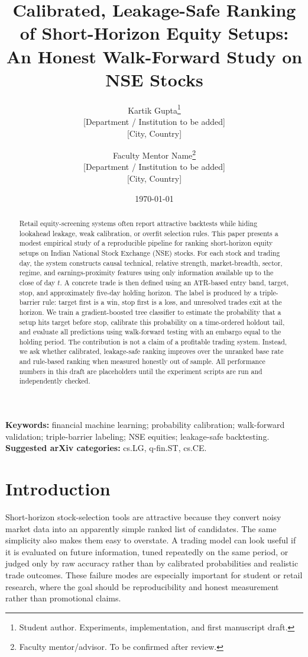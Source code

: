 \documentclass[11pt]{article}
\title{Calibrated, Leakage-Safe Ranking of Short-Horizon Equity Setups:\\
An Honest Walk-Forward Study on NSE Stocks}
\author{
Kartik Gupta\thanks{Student author. Experiments, implementation, and first manuscript draft.}\\
\small [Department / Institution to be added]\\
\small [City, Country]\\
\and
Faculty Mentor Name\thanks{Faculty mentor/advisor. To be confirmed after review.}\\
\small [Department / Institution to be added]\\
\small [City, Country]
}
\date{\today}
\begin{document}
\maketitle

\begin{abstract}
Retail equity-screening systems often report attractive backtests while hiding
lookahead leakage, weak calibration, or overfit selection rules. This paper
presents a modest empirical study of a reproducible pipeline for ranking
short-horizon equity setups on Indian National Stock Exchange (NSE) stocks. For
each stock and trading day, the system constructs causal technical, relative
strength, market-breadth, sector, regime, and earnings-proximity features using
only information available up to the close of day $t$. A concrete trade is then
defined using an ATR-based entry band, target, stop, and approximately five-day
holding horizon. The label is produced by a triple-barrier rule: target first is
a win, stop first is a loss, and unresolved trades exit at the horizon. We train
a gradient-boosted tree classifier to estimate the probability that a setup hits
target before stop, calibrate this probability on a time-ordered holdout tail,
and evaluate all predictions using walk-forward testing with an embargo equal
to the holding period. The contribution is not a claim of a profitable trading
system. Instead, we ask whether calibrated, leakage-safe ranking improves over
the unranked base rate and rule-based ranking when measured honestly out of
sample. All performance numbers in this draft are placeholders until the
experiment scripts are run and independently checked.
\end{abstract}

\noindent\textbf{Keywords:} financial machine learning; probability calibration;
walk-forward validation; triple-barrier labeling; NSE equities; leakage-safe
backtesting.\\
\textbf{Suggested arXiv categories:} cs.LG, q-fin.ST, cs.CE.

\section{Introduction}

Short-horizon stock-selection tools are attractive because they convert noisy
market data into an apparently simple ranked list of candidates. The same
simplicity also makes them easy to overstate. A trading model can look useful if
it is evaluated on future information, tuned repeatedly on the same period,
or judged only by raw accuracy rather than by calibrated probabilities and
realistic trade outcomes. These failure modes are especially important for
student or retail research, where the goal should be reproducibility and honest
measurement rather than promotional claims.
\end{document}
